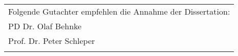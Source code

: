 \vspace{15cm}

{ \large

  \begin{tabular}{l}


    Folgende Gutachter empfehlen die Annahme der Dissertation:  \\ PD Dr. Olaf Behnke \\
                                 Prof. Dr. Peter Schleper \\ \\

  \end{tabular}
}
\clearpage